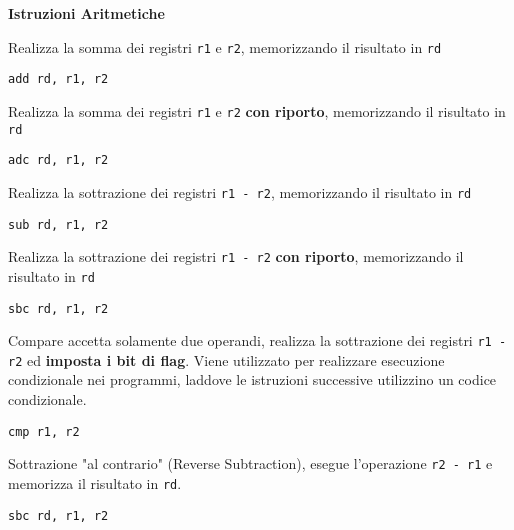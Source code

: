\begin{defn}
\textbf{Istruzioni Aritmetiche}

Realizza la somma dei registri \verb|r1| e \verb|r2|, memorizzando il risultato in \verb|rd|
\begin{lstlisting}[style=arm]
add rd, r1, r2
\end{lstlisting}

Realizza la somma dei registri \verb|r1| e \verb|r2| \textbf{con riporto}, memorizzando il risultato in \verb|rd|
\begin{lstlisting}[style=arm]
adc rd, r1, r2
\end{lstlisting}

Realizza la sottrazione dei registri \verb|r1 - r2|, memorizzando il risultato in \verb|rd|
\begin{lstlisting}[style=arm]
sub rd, r1, r2
\end{lstlisting}

Realizza la sottrazione dei registri \verb|r1 - r2| \textbf{con riporto}, memorizzando il risultato in \verb|rd|
\begin{lstlisting}[style=arm]
sbc rd, r1, r2
\end{lstlisting}

Compare accetta solamente due operandi, realizza la sottrazione dei registri \verb|r1 - r2| ed \textbf{imposta i bit di flag}. Viene utilizzato per realizzare esecuzione condizionale nei programmi, laddove le istruzioni successive utilizzino un codice condizionale.
\begin{lstlisting}[style=arm]
cmp r1, r2
\end{lstlisting}

Sottrazione "al contrario" (Reverse Subtraction), esegue l'operazione \verb|r2 - r1| e memorizza il risultato in \verb|rd|.
\begin{lstlisting}[style=arm]
sbc rd, r1, r2
\end{lstlisting}

\end{defn}

